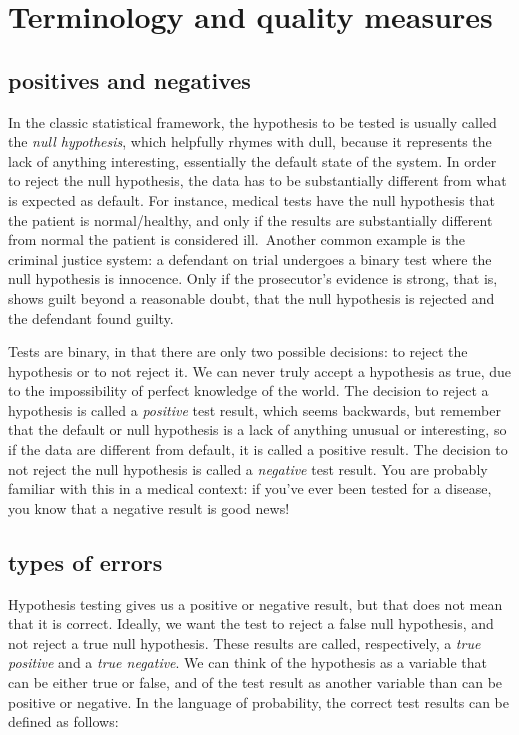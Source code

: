 \documentclass[
  letterpaper,
  DIV=11,
  numbers=noendperiod]{scrreprt}
\begin{document}
\hypertarget{terminology-and-quality-measures}{%
\section{Terminology and quality
measures}\label{terminology-and-quality-measures}}

\hypertarget{positives-and-negatives}{%
\subsection{positives and negatives}\label{positives-and-negatives}}

In the classic statistical framework, the hypothesis to be tested is
usually called the \emph{null hypothesis}, which helpfully rhymes with
dull, because it represents the lack of anything interesting,
essentially the default state of the system. In order to reject the null
hypothesis, the data has to be substantially different from what is
expected as default. For instance, medical tests have the null
hypothesis that the patient is normal/healthy, and only if the results
are substantially different from normal the patient is considered
ill.~Another common example is the criminal justice system: a defendant
on trial undergoes a binary test where the null hypothesis is innocence.
Only if the prosecutor's evidence is strong, that is, shows guilt beyond
a reasonable doubt, that the null hypothesis is rejected and the
defendant found guilty.

Tests are binary, in that there are only two possible decisions: to
reject the hypothesis or to not reject it. We can never truly accept a
hypothesis as true, due to the impossibility of perfect knowledge of the
world. The decision to reject a hypothesis is called a \emph{positive}
test result, which seems backwards, but remember that the default or
null hypothesis is a lack of anything unusual or interesting, so if the
data are different from default, it is called a positive result. The
decision to not reject the null hypothesis is called a \emph{negative}
test result. You are probably familiar with this in a medical context:
if you've ever been tested for a disease, you know that a negative
result is good news!

\hypertarget{types-of-errors}{%
\subsection{types of errors}\label{types-of-errors}}

Hypothesis testing gives us a positive or negative result, but that does
not mean that it is correct. Ideally, we want the test to reject a false
null hypothesis, and not reject a true null hypothesis. These results
are called, respectively, a \emph{true positive} and a \emph{true
negative}. We can think of the hypothesis as a variable that can be
either true or false, and of the test result as another variable than
can be positive or negative. In the language of probability, the correct
test results can be defined as follows:
\end{document}
